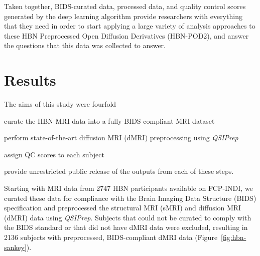 \documentclass[fleqn,10pt]{wlscirep}
\begin{document}
Taken together, BIDS-curated data, processed data, and quality control scores
generated by the deep learning algorithm provide researchers with everything
that they need in order to start applying a large variety of analysis approaches
to these HBN Preprocessed Open Diffusion Derivatives (HBN-POD2), and answer the
questions that this data was collected to answer.

\section*{Results}

The aims of this study were fourfold
\begin{enumerate*}[%
    label=(\roman*),%
    before=\unskip{: },%
    itemjoin={{, }},%
    itemjoin*={{, and }}]
    \item curate the HBN MRI data into a fully-BIDS compliant MRI dataset
    \item perform state-of-the-art diffusion MRI (dMRI) preprocessing using \emph{QSIPrep}
    \item assign QC scores to each subject
    \item provide unrestricted public release of the outputs from each of these
    steps.
\end{enumerate*}

Starting with MRI data from \num{2747} HBN participants available on FCP-INDI,
we curated these data for compliance with the Brain Imaging Data Structure
(BIDS) specification \cite{gorgolewski2016-lh} and preprocessed the structural
MRI (sMRI) and diffusion MRI (dMRI) data using \emph{QSIPrep}. Subjects that
could not be curated to comply with the BIDS standard or that did not have dMRI
data were excluded, resulting in \num{2136} subjects with preprocessed,
BIDS-compliant dMRI data (Figure~\ref{fig:hbn-sankey}).

\end{document}
